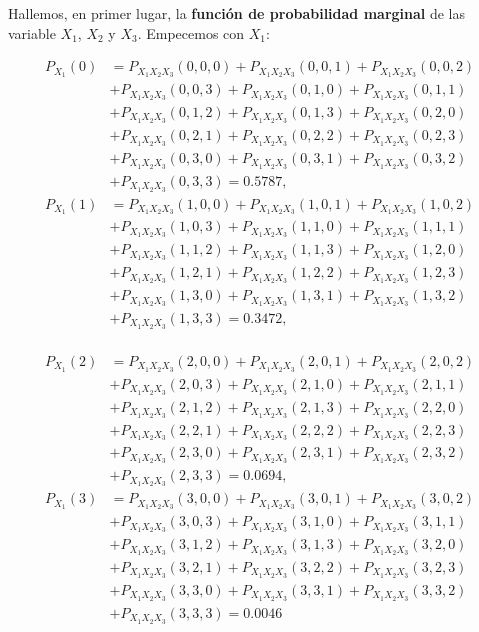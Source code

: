 \documentclass[
  letterpaper,
  DIV=11,
  numbers=noendperiod]{scrreprt}
\begin{document}
Hallemos, en primer lugar, la \textbf{función de probabilidad marginal}
de las variable \(X_1\), \(X_2\) y \(X_3\). Empecemos con \(X_1\):

\[
\begin{array}{rl}
P_{X_1}(0) 
& = P_{X_1X_2X_3}(0,0,0)+P_{X_1X_2X_3}(0,0,1)+P_{X_1X_2X_3}(0,0,2)\\
& +P_{X_1X_2X_3}(0,0,3)+P_{X_1X_2X_3}(0,1,0)+P_{X_1X_2X_3}(0,1,1)\\
& +P_{X_1X_2X_3}(0,1,2)+P_{X_1X_2X_3}(0,1,3)+P_{X_1X_2X_3}(0,2,0)\\
& +P_{X_1X_2X_3}(0,2,1)+P_{X_1X_2X_3}(0,2,2)+P_{X_1X_2X_3}(0,2,3)\\
& +P_{X_1X_2X_3}(0,3,0)+P_{X_1X_2X_3}(0,3,1)+P_{X_1X_2X_3}(0,3,2)\\
& +P_{X_1X_2X_3}(0,3,3)=0.5787,\\
P_{X_1}(1) 
& = P_{X_1X_2X_3}(1,0,0)+P_{X_1X_2X_3}(1,0,1)+P_{X_1X_2X_3}(1,0,2)\\
& +P_{X_1X_2X_3}(1,0,3)+P_{X_1X_2X_3}(1,1,0)+P_{X_1X_2X_3}(1,1,1)\\
& +P_{X_1X_2X_3}(1,1,2)+P_{X_1X_2X_3}(1,1,3)+P_{X_1X_2X_3}(1,2,0)\\
& +P_{X_1X_2X_3}(1,2,1)+P_{X_1X_2X_3}(1,2,2)+P_{X_1X_2X_3}(1,2,3)\\
& +P_{X_1X_2X_3}(1,3,0)+P_{X_1X_2X_3}(1,3,1)+P_{X_1X_2X_3}(1,3,2)\\ 
& + P_{X_1X_2X_3}(1,3,3)=0.3472,\\
\end{array}
\]

\[
\begin{array}{rl}
P_{X_1}(2) 
& = P_{X_1X_2X_3}(2,0,0)+P_{X_1X_2X_3}(2,0,1)+P_{X_1X_2X_3}(2,0,2)\\
& + P_{X_1X_2X_3}(2,0,3)+P_{X_1X_2X_3}(2,1,0)+P_{X_1X_2X_3}(2,1,1)\\
& + P_{X_1X_2X_3}(2,1,2)+P_{X_1X_2X_3}(2,1,3)+P_{X_1X_2X_3}(2,2,0)\\
& + P_{X_1X_2X_3}(2,2,1)+P_{X_1X_2X_3}(2,2,2)+P_{X_1X_2X_3}(2,2,3)\\
& + P_{X_1X_2X_3}(2,3,0)+P_{X_1X_2X_3}(2,3,1)+P_{X_1X_2X_3}(2,3,2)\\
& + P_{X_1X_2X_3}(2,3,3)=0.0694,\\
P_{X_1}(3) 
& = P_{X_1X_2X_3}(3,0,0)+P_{X_1X_2X_3}(3,0,1)+P_{X_1X_2X_3}(3,0,2)\\
& + P_{X_1X_2X_3}(3,0,3)+P_{X_1X_2X_3}(3,1,0)+P_{X_1X_2X_3}(3,1,1)\\
& + P_{X_1X_2X_3}(3,1,2)+P_{X_1X_2X_3}(3,1,3)+P_{X_1X_2X_3}(3,2,0)\\
& + P_{X_1X_2X_3}(3,2,1)+P_{X_1X_2X_3}(3,2,2)+P_{X_1X_2X_3}(3,2,3)\\
& + P_{X_1X_2X_3}(3,3,0)+P_{X_1X_2X_3}(3,3,1)+P_{X_1X_2X_3}(3,3,2)\\ 
& + P_{X_1X_2X_3}(3,3,3)=0.0046
\end{array}
\]
\end{document}
